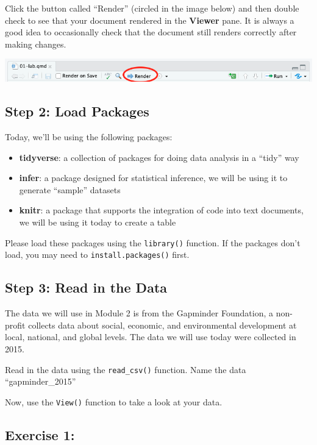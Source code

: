\documentclass[
  letterpaper,
  DIV=11,
  numbers=noendperiod]{scrartcl}
\providecommand{\tightlist}{%
  \setlength{\itemsep}{0pt}\setlength{\parskip}{0pt}}\usepackage{longtable,booktabs,array}
\begin{document}
Click the button called ``Render'' (circled in the image below) and then
double check to see that your document rendered in the \textbf{Viewer}
pane. It is always a good idea to occasionally check that the document
still renders correctly after making changes.

\includegraphics{images/render.png}

\subsection{Step 2: Load Packages}\label{step-2-load-packages}

Today, we'll be using the following packages:

\begin{itemize}
\tightlist
\item
  \textbf{tidyverse}: a collection of packages for doing data analysis
  in a ``tidy'' way
\item
  \textbf{infer}: a package designed for statistical inference, we will
  be using it to generate ``sample'' datasets
\item
  \textbf{knitr}: a package that supports the integration of code into
  text documents, we will be using it today to create a table
\end{itemize}

Please load these packages using the \texttt{library()} function. If the
packages don't load, you may need to \texttt{install.packages()} first.

\subsection{Step 3: Read in the Data}\label{step-3-read-in-the-data}

The data we will use in Module 2 is from the Gapminder Foundation, a
non-profit collects data about social, economic, and environmental
development at local, national, and global levels. The data we will use
today were collected in 2015.

Read in the data using the \texttt{read\_csv()} function. Name the data
``gapminder\_2015''

Now, use the \texttt{View()} function to take a look at your data.

\subsection{Exercise 1:}\label{exercise-1}
\end{document}
